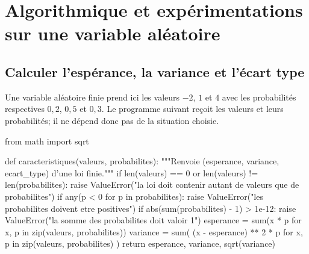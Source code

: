 
\section{Algorithmique et expérimentations sur une variable aléatoire}

\subsection{Calculer l'espérance, la variance et l'écart type}

Une variable aléatoire finie prend ici les valeurs $-2$, $1$ et $4$ avec
les probabilités respectives $0{,}2$, $0{,}5$ et $0{,}3$. Le programme
suivant reçoit les valeurs et leurs probabilités; il ne dépend donc pas de
la situation choisie.

\begin{python}
from math import sqrt

def caracteristiques(valeurs, probabilites):
    """Renvoie (esperance, variance, ecart_type) d'une loi finie."""
    if len(valeurs) == 0 or len(valeurs) != len(probabilites):
        raise ValueError("la loi doit contenir autant de valeurs que de probabilites")
    if any(p < 0 for p in probabilites):
        raise ValueError("les probabilites doivent etre positives")
    if abs(sum(probabilites) - 1) > 1e-12:
        raise ValueError("la somme des probabilites doit valoir 1")
    esperance = sum(x * p for x, p in zip(valeurs, probabilites))
    variance = sum(
        (x - esperance) ** 2 * p
        for x, p in zip(valeurs, probabilites)
    )
    return esperance, variance, sqrt(variance)
\end{python}


